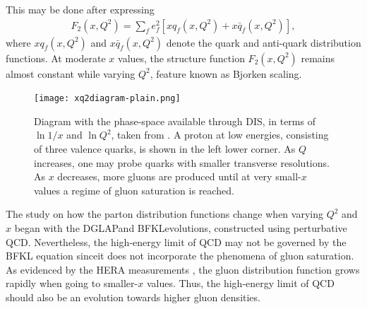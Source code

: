 \begin{note}
This may be done after expressing
\begin{align*}
    F_{2}\left(x, Q^{2}\right)=\sum_{f} e_{f}^{2}\left[x q_{f}\left(x, Q^{2}\right)+x \bar{q}_{f}\left(x, Q^{2}\right)\right],
\end{align*}
where $x q_{f}\left(x, Q^{2}\right)$ and $x \bar{q}_{f}\left(x, Q^{2}\right)$ denote the quark and anti-quark distribution functions. At moderate $x$ values, the structure function $F_{2}\left(x, Q^{2}\right)$ remains almost constant while varying $Q^2$, feature known as Bjorken scaling.
\end{note}

\vspace{1.2cm}

\begin{figure}[!hbt]
	\centering
    \texttt{[image: xq2diagram-plain.png]}
    \caption{\normalsize Diagram with the phase-space available through {\sffamily DIS}, in terms of $\ln{1/x}$ and $\ln{Q^2}$, taken from \cite{xq2diagrams}. A proton at low energies, consisting of three valence quarks, is shown in the left lower corner. As $Q$ increases, one may probe quarks with smaller transverse resolutions. As $x$ decreases, more gluons are produced until at very small-$x$ values a regime of gluon saturation is reached.}
\end{figure}

The study on how the parton distribution functions change when varying $Q^2$ and $x$ began with the {\sffamily DGLAP}and {\sffamily BFKL}evolutions, constructed using perturbative {\sffamily QCD}. Nevertheless, the high-energy limit of {\sffamily QCD} may not be governed by the {\sffamily BFKL} equation sinceit does not incorporate the phenomena of {\sffamily\color{ming} gluon saturation}. As evidenced by the {\sffamily HERA} measurements \cite{Abramowicz:2015mha}, the gluon distribution function grows rapidly when going to smaller-$x$ values. Thus, the high-energy limit of {\sffamily QCD} should also be an evolution towards higher gluon densities.

